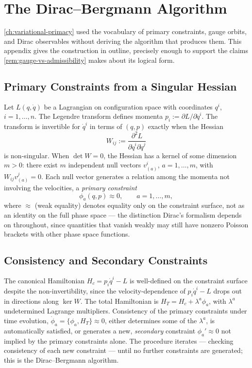 \documentclass[11pt]{book}
\theoremstyle{plain}
\theoremstyle{definition}
\theoremstyle{remark}
\begin{document}
\chapter{The Dirac--Bergmann Algorithm}
\label{app:dirac-bergmann}

\cref{ch:variational-primacy} used the vocabulary of primary
constraints, gauge orbits, and Dirac observables without deriving the
algorithm that produces them. This appendix gives the construction in
outline, precisely enough to support the claims
\cref{rem:gauge-vs-admissibility} makes about its logical form.

\section{Primary Constraints from a Singular Hessian}

Let $L(q,\dot q)$ be a Lagrangian on configuration space with
coordinates $q^i$, $i = 1,\dots,n$. The Legendre transform defines
momenta $p_i := \partial L/\partial \dot q^i$. The transform is
invertible for $\dot q^i$ in terms of $(q,p)$ exactly when the Hessian
\[
W_{ij} := \frac{\partial^2 L}{\partial \dot q^i \partial \dot q^j}
\]
is non-singular. When $\det W = 0$, the Hessian has a kernel of some
dimension $m > 0$: there exist $m$ independent null vectors
$v^i_{(a)}$, $a = 1,\dots,m$, with $W_{ij} v^j_{(a)} = 0$. Each null
vector generates a relation among the momenta not involving the
velocities, a \emph{primary constraint}
\[
\phi_a(q,p) \approx 0, \qquad a = 1,\dots,m,
\]
where $\approx$ (weak equality) denotes equality only on the
constraint surface, not as an identity on the full phase space --- the
distinction Dirac's formalism depends on throughout, since quantities
that vanish weakly may still have nonzero Poisson brackets with other
phase space functions.

\section{Consistency and Secondary Constraints}

The canonical Hamiltonian $H_c = p_i \dot q^i - L$ is well-defined on
the constraint surface despite the non-invertibility, since the
velocity-dependence of $p_i\dot q^i - L$ drops out in directions along
$\ker W$. The total Hamiltonian is $H_T = H_c + \lambda^a \phi_a$,
with $\lambda^a$ undetermined Lagrange multipliers. Consistency of the
primary constraints under time evolution, $\dot\phi_a = \{\phi_a, H_T\}
\approx 0$, either determines some of the $\lambda^a$, is
automatically satisfied, or generates a new, \emph{secondary}
constraint $\phi_a' \approx 0$ not implied by the primary constraints
alone. The procedure iterates --- checking consistency of each new
constraint --- until no further constraints are generated; this is the
Dirac--Bergmann algorithm.
\end{document}
